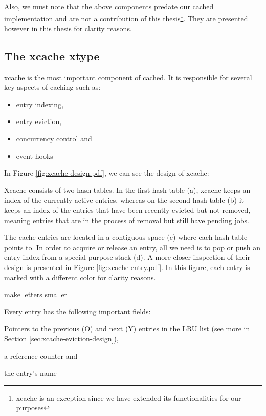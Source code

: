 Also, we must note that the above components predate our cached implementation 
and are not a contribution of this thesis\footnote{xcache is an exception since 
	we have extended its functionalities for our purposes}. They are 
presented however in this thesis for clarity reasons. 

\subsection{The xcache xtype}\label{sec:xcache-design}

xcache is the most important component of cached. It is responsible for several 
key aspects of caching such as:

\begin{itemize}
	\item entry indexing,
	\item entry eviction,
	\item concurrency control and
	\item event hooks
\end{itemize}

In Figure \ref{fig:xcache-design.pdf}, we can see the design of xcache:


Xcache consists of two hash tables. In the first hash table (a), xcache keeps 
an index of the currently active entries, whereas on the second hash table (b) 
it keeps an index of the entries that have been recently evicted but not 
removed, meaning entries that are in the process of removal but still have 
pending jobs.

The cache entries are located in a contiguous space (c) where each hash table 
points to. In order to acquire or release an entry, all we need is to pop or 
push an entry index from a special purpose stack (d). A more closer inspection 
of their design is presented in Figure \ref{fig:xcache-entry.pdf}. In this 
figure, each entry is marked with a different color for clarity reasons.

\fixme make letters smaller

Every entry has the following important fields:
\begin{inparaenum}[i.]
	\item Pointers to the previous (O) and next (Y) entries in the LRU list 
		(see more in Section \ref{sec:xcache-eviction-design}),
	\item a reference counter and
	\item the entry's name
\end{inparaenum}

